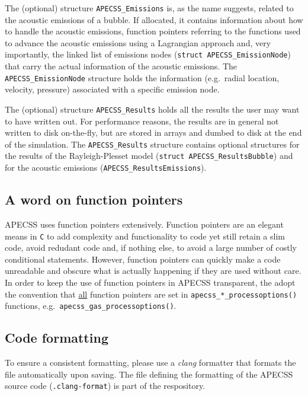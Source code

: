 The (optional) structure {\tt APECSS\_Emissions} is, as the name suggests, related to the acoustic emissions of a bubble. If allocated, it contains information about how to handle the acoustic emissions, function pointers referring to the functions used to advance the acoustic emissions using a Lagrangian approach and, very importantly, the linked list of emissions nodes ({\tt struct APECSS\_EmissionNode}) that carry the actual information of the acoustic emissions. The {\tt APECSS\_EmissionNode} structure holds the information (e.g.~radial location, velocity, pressure) associated with a specific emission node.

The (optional) structure {\tt APECSS\_Results} holds all the results the user may want to have written out. For performance reasons, the results are in general not written to disk on-the-fly, but are stored in arrays and dumbed to disk at the end of the simulation. The {\tt APECSS\_Results} structure contains optional structures for the results of the Rayleigh-Plesset model ({\tt struct APECSS\_ResultsBubble}) and for the acoustic emissions ({\tt APECSS\_ResultsEmissions}).


\subsection{A word on function pointers}

APECSS uses function pointers extensively. Function pointers are an elegant means in {\tt C} to add complexity and functionality to code yet still retain a slim code, avoid redudant code and, if nothing else, to avoid a large number of costly conditional statements. However, function pointers can quickly make a code unreadable and obscure what is actually happening if they are used without care. In order to keep the use of function pointers in APECSS transparent, the adopt the convention that \underline{all} function pointers are set in {\tt apecss\_*\_processoptions()} functions, e.g.~{\tt apecss\_gas\_processoptions()}.

\subsection{Code formatting}

To ensure a consistent formatting, please use a \textit{clang} formatter that formats the file automatically upon saving. The file defining the formatting of the APECSS source code ({\tt .clang-format}) is part of the respository.
